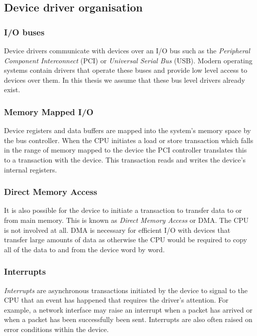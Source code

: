 \subsection{Device driver organisation}
\subsubsection{I/O buses}

Device drivers communicate with devices over an I/O bus such as the \emph{Peripheral Component Interconnect} (PCI) or \emph{Universal Serial Bus} (USB). Modern operating systems contain drivers that operate these buses and provide low level access to devices over them. In this thesis we assume that these bus level drivers already exist. 

\subsubsection{Memory Mapped I/O}

Device registers and data buffers are mapped into the system's memory space by the bus controller. When the CPU initiates a load or store transaction which falls in the range of memory mapped to the device the PCI controller translates this to a transaction with the device. This transaction reads and writes the device's internal registers.

\subsubsection{Direct Memory Access}

It is also possible for the device to initiate a transaction to transfer data to or from main memory. This is known as \emph{Direct Memory Access} or DMA. The CPU is not involved at all. DMA is necessary for efficient I/O with devices that transfer large amounts of data as otherwise the CPU would be required to copy all of the data to and from the device word by word.

\subsubsection{Interrupts}

\emph{Interrupts} are asynchronous transactions initiated by the device to signal to the CPU that an event has happened that requires the driver's attention. For example, a network interface may raise an interrupt when a packet has arrived or when a packet has been successfully been sent. Interrupts are also often raised on error conditions within the device.

